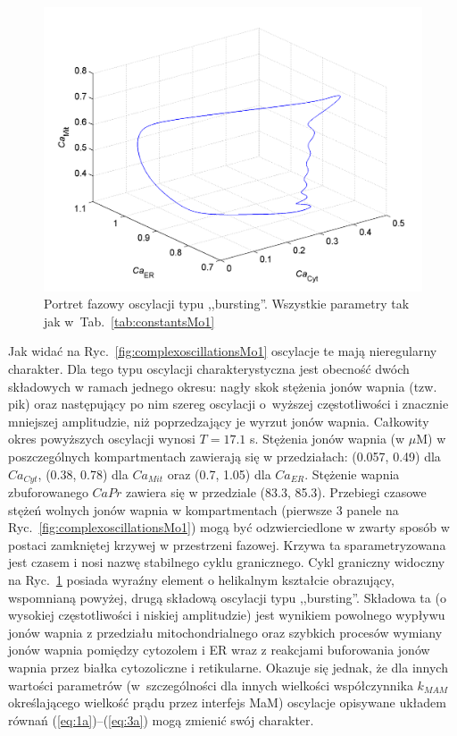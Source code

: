 \begin{figure}[ht]
	\centering
	\includegraphics[width=1\textwidth]{rysunki/rozdzial_5/bursting_cycleMo1}
	\caption[Portret fazowy 3-D w Modelu \#1- oscylacje bursting]{Portret fazowy oscylacji typu ,,bursting''. Wszystkie parametry tak jak w~Tab.~\ref{tab:constantsMo1}}
	\label{fig:phaseportraitcomplexMo1}
\end{figure}

Jak widać na Ryc.~\ref{fig:complexoscillationsMo1} oscylacje te mają nieregularny charakter. Dla tego typu oscylacji charakterystyczna jest obecność dwóch składowych w ramach jednego okresu: nagły skok stężenia jonów wapnia (tzw. pik) oraz następujący po nim szereg oscylacji o~wyższej częstotliwości i znacznie mniejszej amplitudzie, niż poprzedzający je wyrzut jonów wapnia. Całkowity okres powyższych oscylacji wynosi $T= 17.1$ s. Stężenia jonów wapnia (w $\mu$M)  w poszczególnych kompartmentach zawierają się w przedziałach: (0.057, 0.49) dla $Ca_{Cyt}$, (0.38, 0.78) dla $Ca_{Mit}$ oraz (0.7, 1.05) dla $Ca_{ER}$. Stężenie wapnia zbuforowanego $CaPr$ zawiera się w przedziale (83.3, 85.3). Przebiegi czasowe stężeń wolnych jonów wapnia w kompartmentach (pierwsze 3 panele na Ryc.~\ref{fig:complexoscillationsMo1}) mogą być odzwierciedlone w zwarty sposób w postaci zamkniętej krzywej w przestrzeni fazowej. Krzywa ta sparametryzowana jest czasem i nosi nazwę stabilnego cyklu granicznego. Cykl graniczny widoczny na Ryc.~\ref{fig:phaseportraitcomplexMo1} posiada wyraźny element o helikalnym kształcie obrazujący, wspomnianą powyżej, drugą składową oscylacji typu ,,bursting''. Składowa ta (o wysokiej częstotliwości i niskiej amplitudzie) jest wynikiem powolnego wypływu jonów wapnia z przedziału mitochondrialnego oraz szybkich procesów wymiany jonów wapnia pomiędzy cytozolem i ER wraz z reakcjami buforowania jonów wapnia przez białka cytozoliczne i retikularne. Okazuje się jednak, że dla innych wartości  parametrów (w~szczególności dla innych wielkości współczynnika $k_{MAM}$ określającego wielkość prądu przez interfejs MaM) oscylacje opisywane układem równań (\ref{eq:1a})--(\ref{eq:3a}) mogą zmienić swój charakter.

